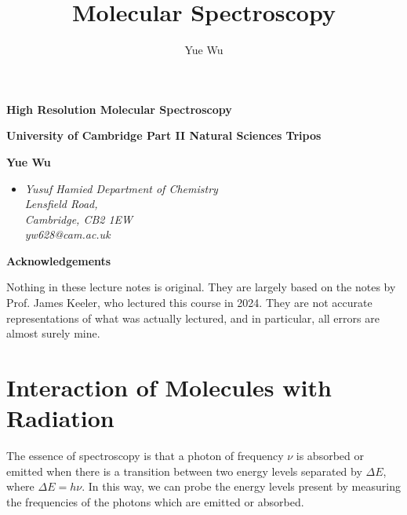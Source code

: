 \documentclass{article}
\title{Molecular Spectroscopy}
\author{Yue Wu}
\theoremstyle{plain}\theoremheaderfont{\normalfont\itshape}\theorembodyfont{\rmfamily}\theoremseparator{.}\newtheorem*{rem}{Remark}\newtheorem*{ex}{Example}\newtheorem*{proof}{Proof}\newtheorem*{altp}{Alternative proof}
\theoremstyle{plain}\theoremheaderfont{\normalfont\bfseries}\theorembodyfont{\rmfamily}\theoremseparator{.}\newtheorem{thm}{Theorem}[section]\newtheorem{lem}[thm]{Lemma}\newtheorem{prop}[thm]{Proposition}\newtheorem*{cor}{Corollary}\newtheorem{defn}[thm]{Definition}\newtheorem{clm}[thm]{Claim}\newtheorem{clminproof}{Claim}\newtheorem{pos}{Postulate}[section]
\theoremstyle{break}\theoremheaderfont{\normalfont\itshape}\theorembodyfont{\rmfamily}\theoremseparator{.\medskip}\newtheorem*{proofskip}{Proof}\newtheorem*{exs}{Examples}\newtheorem*{rems}{Remarks}
\theoremstyle{break}\theoremheaderfont{\normalfont\bfseries}\theorembodyfont{\rmfamily}\theoremseparator{.\medskip}\newtheorem{lemskip}[thm]{Lemma}\newtheorem{defnskip}[thm]{Definition}\newtheorem{propskip}[thm]{Proposition}\newtheorem{thmskip}[thm]{Theorem}
\numberwithin{equation}{section}
\begin{document}
    \setlength{\parindent}{0pt}
	\Huge\textsf{\textbf{High Resolution Molecular Spectroscopy}}
		
	\Large\textsf{\textbf{University of Cambridge Part II Natural Sciences Tripos}}

	\noindent\makebox[\linewidth]{\rule{\textwidth}{2pt}}

	\large\textsf{\textbf{Yue Wu}}
	\begin{itemize}[topsep=0pt,leftmargin=15pt]
		\item[] \textit{Yusuf Hamied Department of Chemistry\\
		Lensfield Road,\\
		Cambridge, CB2 1EW}\\

		\textit{yw628@cam.ac.uk}
	\end{itemize}
    \thispagestyle{empty}
    \setlength{\parindent}{15pt}

    \newpage
    \begin{center}
		\textbf{\Large{Acknowledgements}}
	\end{center}
	\large
	Nothing in these lecture notes is original. They are largely based on the notes by Prof. James Keeler, who lectured this course in 2024. They are not accurate representations of what was actually lectured, and in particular, all errors are almost surely mine.

    \normalsize
	\newpage
	\tableofcontents
	\newpage

    \section{Interaction of Molecules with Radiation}
    The essence of spectroscopy is that a photon of frequency \(\nu\) is absorbed or emitted when there is a transition between two energy levels separated by \(\Delta E\), where \(\Delta E=h\nu\). In this way, we can probe the energy levels present by measuring the frequencies of the photons which are emitted or absorbed.
\end{document}
